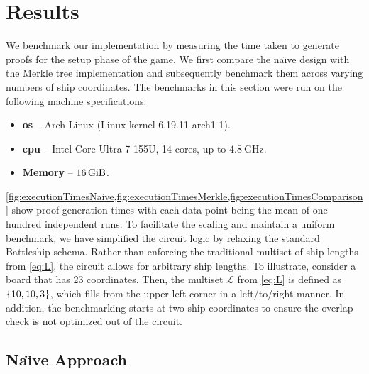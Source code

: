\section{Results}
\label{sec:results}

We benchmark our implementation by measuring the time taken to generate proofs for the setup phase of the game. We first compare the na{\"\i}ve design with the Merkle tree implementation and subsequently benchmark them across varying numbers of ship coordinates. The benchmarks in this section were run on the following machine specifications:

\begin{itemize}
    \item \textbf{\Gls{os}} \--- Arch Linux (Linux kernel 6.19.11-arch1-1).
    \item \textbf{\Gls{cpu}} \--- Intel Core Ultra 7 155U, 14 cores, up to $\qty{4.8}{\giga\hertz}$.
    \item \textbf{Memory} \--- $\qty{16}{\gibi\byte}$.
\end{itemize}

\cref{fig:executionTimesNaive,fig:executionTimesMerkle,fig:executionTimesComparison} show proof generation times with each data point being the mean of one hundred independent runs. To facilitate the scaling and maintain a uniform benchmark, we have simplified the circuit logic by relaxing the standard Battleship schema. Rather than enforcing the traditional multiset of ship lengths from \cref{eq:L}, the circuit allows for arbitrary ship lengths. To illustrate, consider a board that has 23 coordinates. Then, the multiset $\mathcal{L}$ from \cref{eq:L} is defined as $\set{10, 10, 3}$, which fills from the upper left corner in a left\-/to\-/right manner. In addition, the benchmarking starts at two ship coordinates to ensure the overlap check is not optimized out of the circuit.

\subsection{Na{\"\i}ve Approach}
\label{subsec:naiveApproach}

